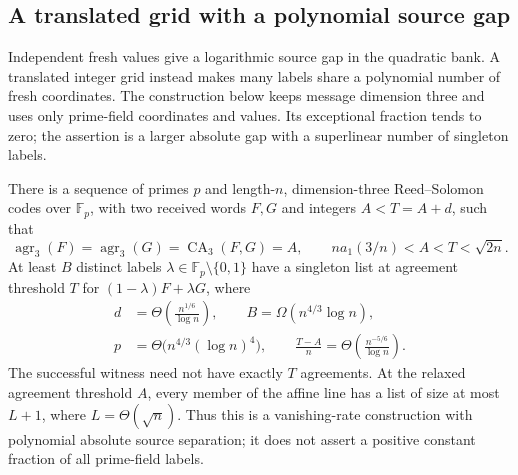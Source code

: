 \subsection{A translated grid with a polynomial source gap}
\label{subsec:translated-grid-polynomial-gap}

Independent fresh values give a logarithmic source gap in the quadratic
bank.  A translated integer grid instead makes many labels share a
polynomial number of fresh coordinates.  The construction below keeps
message dimension three and uses only prime-field coordinates and values.
Its exceptional fraction tends to zero; the assertion is a larger
absolute gap with a superlinear number of singleton labels.

\begin{theorem}
\label{thm:translated-grid-polynomial-gap}
There is a sequence of primes $p$ and length-$n$, dimension-three
Reed--Solomon codes over $\mathbb F_p$, with two received words $F,G$
and integers $A<T=A+d$, such that
\[
 \operatorname{agr}_3(F)=\operatorname{agr}_3(G)
   =\operatorname{CA}_3(F,G)=A,
 \qquad
 n a_1(3/n)<A<T<\sqrt{2n}.
\]
At least $B$ distinct labels $\lambda\in\mathbb F_p\setminus\{0,1\}$
have a singleton list at agreement threshold $T$ for
$(1-\lambda)F+\lambda G$, where
\[
 \begin{split}
 d&=\Theta\!\left(\frac{n^{1/6}}{\log n}\right),\qquad
 B=\Omega(n^{4/3}\log n),\\
 p&=\Theta\bigl(n^{4/3}(\log n)^4\bigr),\qquad
 \frac{T-A}{n}
   =\Theta\!\left(\frac{n^{-5/6}}{\log n}\right).
 \end{split}
\]
The successful witness need not have exactly $T$ agreements.
At the relaxed agreement threshold $A$, every member of the affine
line has a list of size at most $L+1$, where $L=\Theta(\sqrt n)$.
Thus this is a vanishing-rate construction with polynomial absolute
source separation; it does not assert a positive constant fraction of
all prime-field labels.
\end{theorem}
